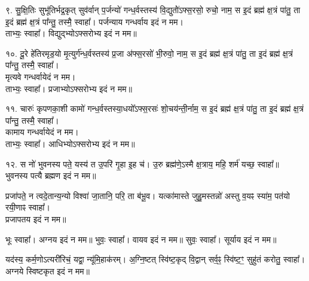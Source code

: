 ९. सु॒क्षि॒तिः सुभू॑तिर्भद्र॒कृत् सुव॑र्वान् प॒र्जन्यो॑ गन्ध॒र्वस्तस्य॑ वि॒द्युतो॑॑ऽफ्स॒रसो॒ रुचो॒ नाम॒ स इ॒दं ब्रह्म॑ क्ष॒त्रं पा॑तु॒ ता इ॒दं ब्रह्म॑ क्ष॒त्रं पा᳚न्तु॒ तस्मै॒ स्वाहा᳚। पर्जन्याय गन्धर्वाय इदं न मम।\\
ताभ्यः॒ स्वाहा᳚। विद्युद्भ्योऽफ्सरोभ्य इदं न मम॥

१०. दू॒रे हे॑तिरमृड॒यो मृ॒त्युर्ग॑न्ध॒र्वस्तस्य॑ प्र॒जा अ॑फ्स॒रसो॑ भी॒रुवो॒ नाम॒ स इ॒दं ब्रह्म॑ क्ष॒त्रं पा॑तु॒ ता इ॒दं ब्रह्म॑ क्ष॒त्रं पा᳚न्तु॒ तस्मै॒ स्वाहा᳚।\\
मृत्यवे गन्धर्वायेदं न मम।\\
ताभ्यः॒ स्वाहा᳚। प्रजाभ्योऽफ्सरोभ्य इदं न मम॥

११. चारुः॑ कृपणका॒शी कामो॑ गन्ध॒र्वस्तस्या॒धयो᳚ऽफ्स॒रसः॑ शो॒चय॑न्ती॒र्नाम॒ स इ॒दं ब्रह्म॑ क्ष॒त्रं पा॑तु॒ ता इ॒दं ब्रह्म॑ क्ष॒त्रं पा᳚न्तु॒ तस्मै॒ स्वाहा᳚।\\
कामाय गन्धर्वायेदं न मम।\\
ताभ्यः॒ स्वाहा᳚। आधिभ्योऽफ्सरोभ्य इदं न मम॥

१२. स नो॑ भुवनस्य पते॒ यस्य॑ त उ॒परि॑ गृ॒हा इ॒ह च॑।
उ॒रु ब्रह्म॑णे॒ऽस्मै क्ष॒त्राय॒ महि॒ शर्म॑ यच्छ॒ स्वाहा᳚॥\\
भुवनस्य पत्यै ब्रह्मण इदं न मम॥

प्रजा॑पते॒ न त्वदे॒तान्य॒न्यो विश्वा॑ जा॒तानि॒ परि॒ ता ब॑भू॒व।
यत्का॑मास्ते जुहु॒मस्तन्नो॑ अस्तु व॒यꣴ स्या॑म॒ पत॑यो रयी॒णाꣴ स्वाहा᳚।\\
प्रजापतय इदं न मम॥

भूः स्वाहा᳚। अग्नय इदं न मम॥
भुवः॒ स्वाहा᳚। वायव इदं न मम॥
सुवः॒ स्वाहा᳚। सूर्याय इदं न मम॥

यद॑स्य॒ कर्म॒णोऽत्यरी॑रिचं॒ यद्वा॒ न्यू॑मि॒हाक॑रम्। अ॒ग्नि॒ष्टत् स्वि॑ष्ट॒कृद् वि॒द्वान् सर्व॒ꣴ॒ स्वि॑ष्ट॒ꣳ॒ सुहु॑तं करोतु॒ स्वाहा᳚। अग्नये स्विष्टकृत इदं न मम॥